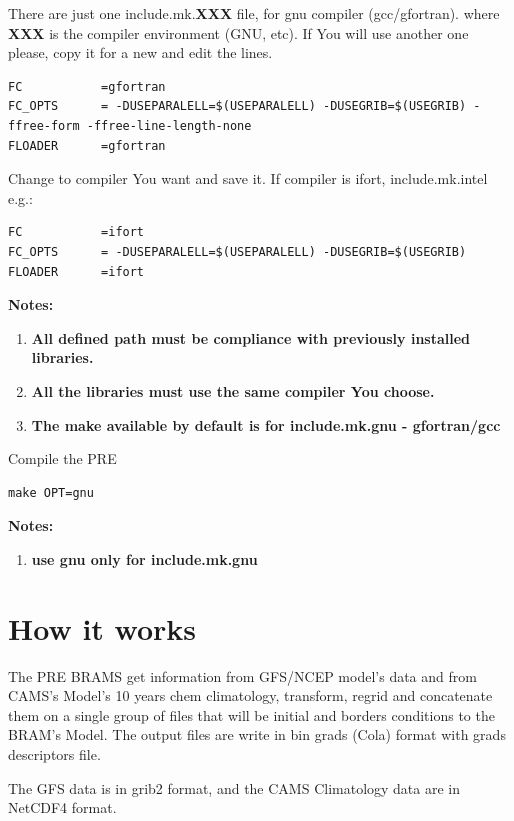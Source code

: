 \documentclass{article}
\begin{document}
There are just one include.mk.\textbf{XXX} file, for gnu compiler (gcc/gfortran). where \textbf{XXX} is the compiler environment (GNU, etc). If You will use another one please, copy it for a new and edit the lines. 

\begin{verbatim}
FC           =gfortran
FC_OPTS      = -DUSEPARALELL=$(USEPARALELL) -DUSEGRIB=$(USEGRIB) -ffree-form -ffree-line-length-none
FLOADER      =gfortran
\end{verbatim}

Change to compiler You want and save it. If compiler is ifort, include.mk.intel e.g.:

\begin{verbatim}
FC           =ifort
FC_OPTS      = -DUSEPARALELL=$(USEPARALELL) -DUSEGRIB=$(USEGRIB)
FLOADER      =ifort
\end{verbatim}

\textbf{Notes:}
\begin{enumerate}
	\item \textbf{All defined path must be compliance with previously installed libraries.}
	\item \textbf{All the libraries must use the same compiler You choose.}
	\item \textbf{The make available by default is for include.mk.gnu - gfortran/gcc}
\end{enumerate}

Compile the PRE

\begin{verbatim}
make OPT=gnu
\end{verbatim}

\textbf{Notes:}
\begin{enumerate}
	\item \textbf{use gnu only for include.mk.gnu}
\end{enumerate}

\section{How it works}

The PRE BRAMS get information from GFS/NCEP model's data and from CAMS's Model's 10 years chem climatology, transform, regrid and concatenate them on a single group of files that will be initial and borders conditions to the BRAM's Model. The output files are write in bin grads (Cola) format with grads descriptors file.

The GFS data is in grib2 format, and the CAMS Climatology data are in NetCDF4 format.
\end{document}
